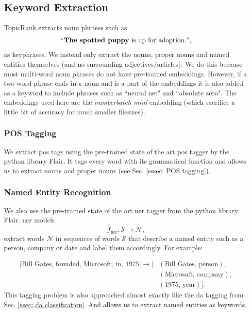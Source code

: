     \subsection{Keyword Extraction}
        TopicRank extracts noun phrases such as
        \begin{equation*}
            ``\textbf{The spotted puppy}\text{ is up for adoption.}",
        \end{equation*}
        as \glspl{keyphrase}. We instead only extract the nouns, proper nouns and named entities themselves (and no surrounding adjectives/articles). We do this because most multi-word noun phrases do not have pre-trained \glspl{embedding}. However, if a two-word phrase ends in a noun and is a part of the \glspl{embedding} it is also added as a keyword to include phrases such as ``neural net" and ``absolute zero". The \glspl{embedding} used here are the \textit{\gls{numberbatch} mini} \gls{embedding} (which sacrifice a little bit of accuracy for much smaller filesizes).

        \subsubsection{POS Tagging}
            We extract \gls{pos} tags using the pre-trained state of the art \gls{pos} tagger by the python library Flair\cite{flairNLP}. It tags every word with its grammatical function and allows us to extract nouns and proper nouns (see Sec. \ref{sssec: POS tagging}).

        \subsubsection{Named Entity Recognition}
            We also use the pre-trained state of the art \gls{ner} tagger from the python library Flair\cite{flairNLP}.
            \Gls{ner} models
            \begin{equation}
              \hat{f}_{\text{ner}}: \mathcal{S} \rightarrow \mathcal{N},
            \end{equation}
            extract words $\mathcal{N}$ in sequences of words $\mathcal{S}$ that describe a named entity such as a person, company or date and label them accordingly. For example:

        \begin{align*}
        \text{[Bill Gates, founded, Microsoft, in, 1975]} \rightarrow [& (\text{Bill Gates, person}), \\
                                                                       & (\text{Microsoft, company}), \\
                                                                       & (\text{1975, year})].
        \end{align*}
        This tagging problem is also approached almost exactly like the \gls{da} tagging from Sec. \ref{ssec: da classification}. And allows us to extract named entities as keywords.

